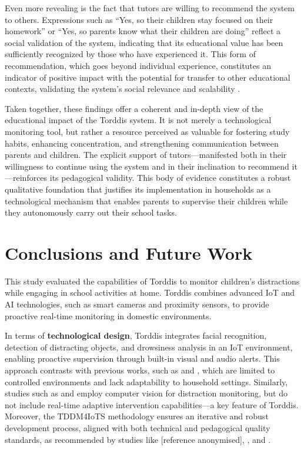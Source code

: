                 Even more revealing is the fact that tutors are willing to recommend the system to others. Expressions such as “Yes, so their children stay focused on their homework” or “Yes, so parents know what their children are doing” reflect a social validation of the system, indicating that its educational value has been sufficiently recognized by those who have experienced it. This form of recommendation, which goes beyond individual experience, constitutes an indicator of positive impact with the potential for transfer to other educational contexts, validating the system’s social relevance and scalability \citep{Panadero2017Review}.
                
                Taken together, these findings offer a coherent and in-depth view of the educational impact of the Torddis system. It is not merely a technological monitoring tool, but rather a resource perceived as valuable for fostering study habits, enhancing concentration, and strengthening communication between parents and children. The explicit support of tutors—manifested both in their willingness to continue using the system and in their inclination to recommend it—reinforces its pedagogical validity. This body of evidence constitutes a robust qualitative foundation that justifies its implementation in households as a technological mechanism that enables parents to supervise their children while they autonomously carry out their school tasks.
                
                \section{Conclusions and Future Work}
                \label{section:eight}
                This study evaluated the capabilities of Torddis to monitor children’s distractions while engaging in school activities at home. Torddis combines advanced IoT and AI technologies, such as smart cameras and proximity sensors, to provide proactive real-time monitoring in domestic environments.
                
                In terms of \textbf{technological design}, Torddis integrates facial recognition, detection of distracting objects, and drowsiness analysis in an IoT environment, enabling proactive supervision through built-in visual and audio alerts. This approach contrasts with previous works, such as \cite{Campbell2015Using} and \cite{Ucar2022Recognizing}, which are limited to controlled environments and lack adaptability to household settings. Similarly, studies such as \cite{Argel2023Intellitell} and \cite{Nguyen2019} employ computer vision for distraction monitoring, but do not include real-time adaptive intervention capabilities—a key feature of Torddis. Moreover, the TDDM4IoTS methodology ensures an iterative and robust development process, aligned with both technical and pedagogical quality standards, as recommended by studies like [reference anonymised], \cite{Hachad2020}, and \cite{Salter2014Exploring}.
                
